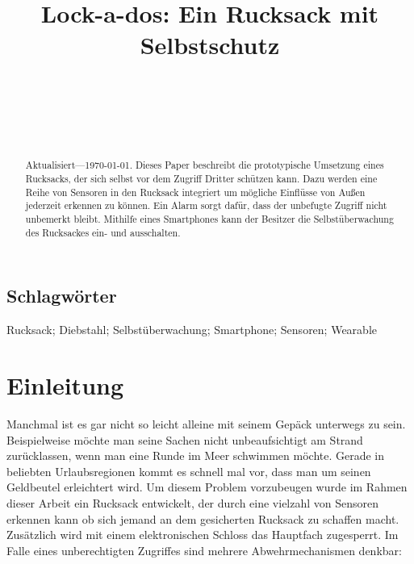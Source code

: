 \documentclass{sigchi}
\def\plaintitle{Lock-a-dos: Ein Rucksack mit Selbstschutz}
\def\plainkeywords{Rucksack; Diebstahl; Selbstüberwachung; Smartphone; Sensoren; Wearable}
\begin{document}
\title{\plaintitle}

\author{%
  \\
  \\
  \\
  \\
}

\maketitle

\begin{abstract}
  Aktualisiert---\today. Dieses Paper beschreibt die prototypische
  Umsetzung eines Rucksacks, der sich selbst vor dem Zugriff Dritter
  schützen kann. Dazu werden eine Reihe von Sensoren in den Rucksack
  integriert um mögliche Einflüsse von Außen jederzeit erkennen zu
  können. Ein Alarm sorgt dafür, dass der unbefugte Zugriff nicht
  unbemerkt bleibt. Mithilfe eines Smartphones kann der Besitzer
  die Selbstüberwachung des Rucksackes ein- und ausschalten.
\end{abstract}

\subsection{Schlagwörter}
\plainkeywords

\section{Einleitung}
Manchmal ist es gar nicht so leicht alleine mit seinem Gepäck
unterwegs zu sein. Beispielweise möchte man seine Sachen nicht 
unbeaufsichtigt am Strand zurücklassen, wenn man eine Runde
im Meer schwimmen möchte. Gerade in beliebten Urlaubsregionen
kommt es schnell mal vor, dass man um seinen Geldbeutel 
erleichtert wird. Um diesem Problem vorzubeugen wurde im Rahmen
dieser Arbeit ein Rucksack entwickelt, der durch eine vielzahl
von Sensoren erkennen kann ob sich jemand an dem gesicherten
Rucksack zu schaffen macht. Zusätzlich wird mit einem
elektronischen Schloss das Hauptfach zugesperrt. Im Falle eines
unberechtigten Zugriffes sind mehrere Abwehrmechanismen denkbar:
\end{document}
